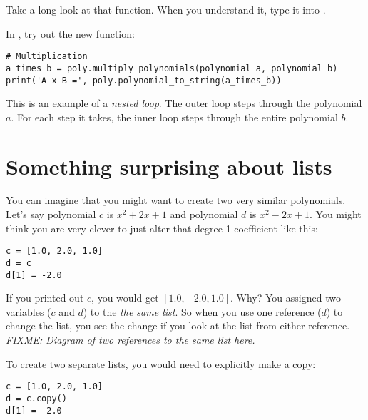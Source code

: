 Take a long look at that function.  When you understand it, type it into .

In , try out the new function:
\begin{Verbatim}
# Multiplication
a_times_b = poly.multiply_polynomials(polynomial_a, polynomial_b)
print('A x B =', poly.polynomial_to_string(a_times_b))
\end{Verbatim}

This is an example of a \emph{nested loop}. The outer loop steps
through the polynomial $a$. For each step it takes, the inner loop
steps through the entire polynomial $b$.

\section{Something surprising about lists}

You can imagine that you might want to create two very similar polynomials. Let's say polynomial $c$ is $x^2 + 2x + 1$ and polynomial $d$ is $x^2 -2x + 1$.  You might think you are very clever to just alter that degree 1 coefficient like this:
\begin{Verbatim}
c = [1.0, 2.0, 1.0]
d = c
d[1] = -2.0
\end{Verbatim}

If you printed out $c$, you would get $[1.0, -2.0, 1.0]$.  Why? You
assigned two variables ($c$ and $d$) to the \emph{the same list}.  So
when you use one reference ($d$) to change the list, you see the
change if you look at the list from either reference. \emph{FIXME:
  Diagram of two references to the same list here.}

To create two separate lists, you would need to explicitly make a copy:
\begin{Verbatim}
c = [1.0, 2.0, 1.0]
d = c.copy()
d[1] = -2.0
\end{Verbatim}

